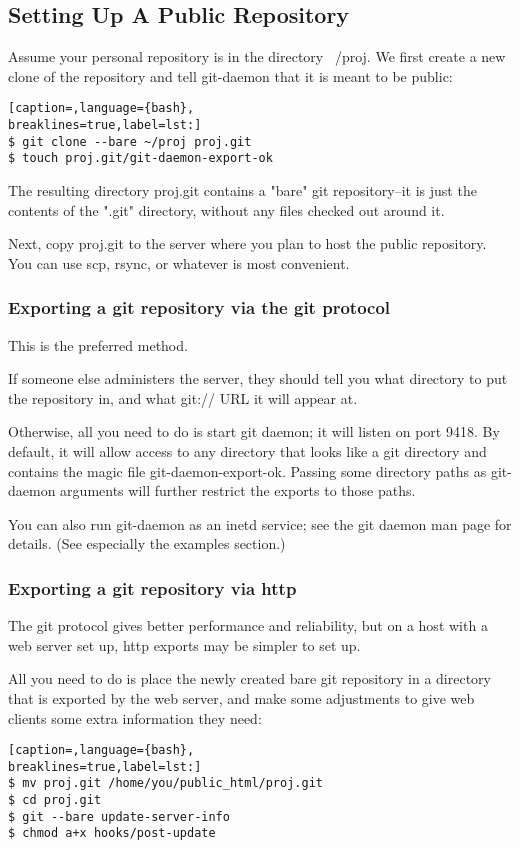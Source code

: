 \subsection{Setting Up A Public Repository}
Assume your personal repository is in the directory ~/proj. We first create a
new clone of the repository and tell git-daemon that it is meant to be public:
\lstset{basicstyle=\scriptsize, numbers=none, captionpos=b, tabsize=4}
\begin{lstlisting}[caption=,language={bash},
breaklines=true,label=lst:]
$ git clone --bare ~/proj proj.git
$ touch proj.git/git-daemon-export-ok
\end{lstlisting}

The resulting directory proj.git contains a "bare" git repository--it is just
the contents of the ".git" directory, without any files checked out around it.

Next, copy proj.git to the server where you plan to host the public repository.
You can use scp, rsync, or whatever is most convenient.

\subsubsection{Exporting a git repository via the git protocol}
This is the preferred method.

If someone else administers the server, they should tell you what directory to
put the repository in, and what git:// URL it will appear at.

Otherwise, all you need to do is start git daemon; it will listen on port 9418.
By default, it will allow access to any directory that looks like a git
directory and contains the magic file git-daemon-export-ok. Passing some
directory paths as git-daemon arguments will further restrict the exports to
those paths.

You can also run git-daemon as an inetd service; see the git daemon man page
for details. (See especially the examples section.)

\subsubsection{Exporting a git repository via http}
The git protocol gives better performance and reliability, but on a host with a
web server set up, http exports may be simpler to set up.

All you need to do is place the newly created bare git repository in a
directory that is exported by the web server, and make some adjustments to give
web clients some extra information they need:
\lstset{basicstyle=\scriptsize, numbers=none, captionpos=b, tabsize=4}
\begin{lstlisting}[caption=,language={bash},
breaklines=true,label=lst:]
$ mv proj.git /home/you/public_html/proj.git
$ cd proj.git
$ git --bare update-server-info
$ chmod a+x hooks/post-update
\end{lstlisting}

